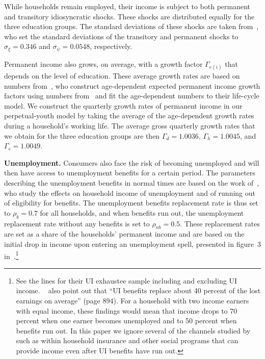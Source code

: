 \documentclass[qe]{econsocart}
\begin{document}
While households remain employed, their income is subject to both permanent and transitory idiosyncratic shocks.
These shocks are distributed equally for the three education groups.
The standard deviations of these shocks are taken from~\cite{carroll2020sticky}, who set the standard deviations of the transitory and permanent shocks to $\sigma_\xi=0.346$ and $\sigma_\psi=0.0548$, respectively.

Permanent income also grows, on average, with a growth factor $\Gamma_{e(i)}$ that depends on the level of education.
These average growth rates are based on numbers from~\cite{carroll2020modeling}, who construct age-dependent expected permanent income growth factors using numbers from~\cite{cagetti2003wealth} and fit the age-dependent numbers to their life-cycle model.
We construct the quarterly growth rates of permanent income in our perpetual-youth model by taking the average of the age-dependent growth rates during a household's working life.
The average gross quarterly growth rates that we obtain for the three education groups are then $\Gamma_d=1.0036$, $\Gamma_h=1.0045$, and $\Gamma_c=1.0049$.

\textbf{Unemployment.} Consumers also face the risk of becoming unemployed and will then have access to unemployment benefits for a certain period.
The parameters describing the unemployment benefits in normal times are based on the work of~\cite{rothstein2017scraping}, who study the effects on household income of unemployment and of running out of eligibility for benefits.
The unemployment benefits replacement rate is thus set to $\rho_b=0.7$ for all households, and when benefits run out, the unemployment replacement rate without any benefits is set to $\rho_{nb}=0.5$.
These replacement rates are set as a share of the households' permanent income and are based on the initial drop in income upon entering an unemployment spell, presented in figure~3 in~\cite{rothstein2017scraping}.\footnote{See the lines for their UI exhaustee sample including and excluding UI income.
  ~\cite{rothstein2017scraping} also point out that ``UI benefits replace about 40 percent of the lost earnings on average'' (page 894).
  For a household with two income earners with equal income, these findings would mean that income drops to 70 percent when one earner becomes unemployed and to 50 percent when benefits run out.
  In this paper we ignore several of the channels studied by~\cite{rothstein2017scraping} such as within household insurance and other social programs that can provide income even after UI benefits have run out.}
\end{document}
